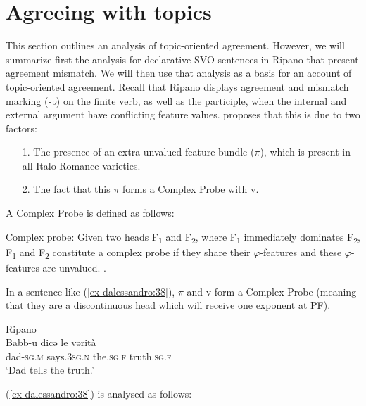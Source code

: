 \documentclass[output=paper
,modfonts
,nonflat]{langsci/langscibook}
\begin{document}
\section{Agreeing with topics} \label{sec-dalessandro:5}
This section outlines an analysis of topic-oriented agreement. However, we will summarize first the analysis for declarative SVO sentences in Ripano that present agreement mismatch. We will then use that analysis as a basis for an account of topic-oriented agreement.
Recall that Ripano displays agreement and mismatch marking (\textit{-ə}) on the finite verb, as well as the participle, when the internal and external argument have conflicting feature values. \citet{D`Alessandro2017} proposes that this is due to two factors:

\begin{enumerate}
\item[1.]The presence of an extra unvalued feature bundle ($\pi $), which is present in all Italo-Romance varieties.
\item[2.]The fact that this $\pi $ forms a Complex Probe with v. 
\end{enumerate}
A Complex Probe is defined as follows:

\begin{exe}
\ex	Complex probe: Given two heads F\textsubscript{1} and F\textsubscript{2}, where F\textsubscript{1} immediately dominates F\textsubscript{2}, F\textsubscript{1} and F\textsubscript{2} constitute a complex probe if they share their $\varphi $-features and these $\varphi $-features are unvalued. \citep[24]{D`Alessandro2017}.
\end{exe}
In a sentence like (\ref{ex-dalessandro:38}), $\pi $ and v form a Complex Probe (meaning that they are a discontinuous head which will receive one exponent at PF). 

\begin{exe}
\ex \label{ex-dalessandro:38}Ripano \citep[107]{Mancini1988/1997}\\
\gll Babb-u   dicə     le   vərità\\
dad\textsc{-sg.m}     says.\textsc{3sg.n}   the.\textsc{sg.f} truth.\textsc{sg.f}\\
\glt `Dad tells the truth.'
\end{exe}
\noindent (\ref{ex-dalessandro:38}) is analysed as follows:
\end{document}
